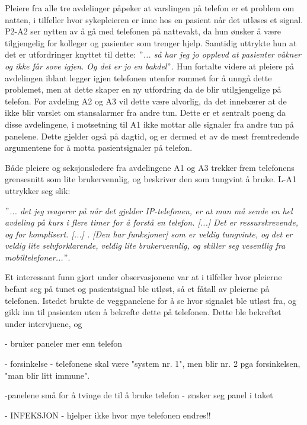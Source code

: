 \noindent
Pleiere fra alle tre avdelinger påpeker at varslingen på telefon er et problem om natten, i tilfeller hvor sykepleieren er inne hos en pasient når det utløses et signal. P2-A2 ser nytten av å gå med telefonen på nattevakt, da hun ønsker å være tilgjengelig for kolleger og pasienter som trenger hjelp. Samtidig uttrykte hun at det er utfordringer knyttet til dette: \textit{ $"$... så har jeg jo opplevd at pasienter våkner og ikke får sove igjen. Og det er jo en bakdel$"$}. Hun fortalte videre at pleiere på avdelingen iblant legger igjen telefonen utenfor rommet for å unngå dette problemet, men at dette skaper en ny utfordring da de blir utilgjengelige på telefon. For avdeling A2 og A3 vil dette være alvorlig, da det innebærer at de ikke blir varslet om stansalarmer fra andre tun. Dette er et sentralt poeng da disse avdelingene, i motsetning til A1 ikke mottar alle signaler fra andre tun på panelene. Dette gjelder også på dagtid, og er dermed et av de mest fremtredende argumentene for å motta pasientsignaler på telefon. 

\noindent
Både pleiere og seksjonsledere fra avdelingene A1 og A3 trekker frem telefonens grensesnitt som lite brukervennlig, og beskriver den som tungvint å bruke. L-A1 uttrykker seg slik:

\noindent
\textit{ $"$... det jeg reagerer på når det gjelder IP-telefonen, er at man må sende en hel avdeling på kurs i flere timer for å forstå en telefon. [...] Det er ressurskrevende, og for komplisert. [...] . [Den har funksjoner] som er veldig tungvinte, og det er veldig lite selvforklarende, veldig lite brukervennlig, og skiller seg vesentlig fra mobiltelefoner...$"$}.

\noindent
Et interessant funn gjort under observasjonene var at i tilfeller hvor pleierne befant seg på tunet og pasientsignal ble utløst, så et fåtall av pleierne på telefonen. Istedet brukte de veggpanelene for å se hvor signalet ble utløst fra, og gikk inn til pasienten uten å bekrefte dette på telefonen. Dette ble bekreftet under intervjuene, og 

- bruker paneler mer enn telefon 

- forsinkelse - telefonene skal være "system nr. 1", men blir nr. 2 pga forsinkelsen, "man blir litt immune".

-panelene små for å tvinge de til å bruke telefon
	- ønsker seg panel i taket




	- INFEKSJON - hjelper ikke hvor mye telefonen endres!!

